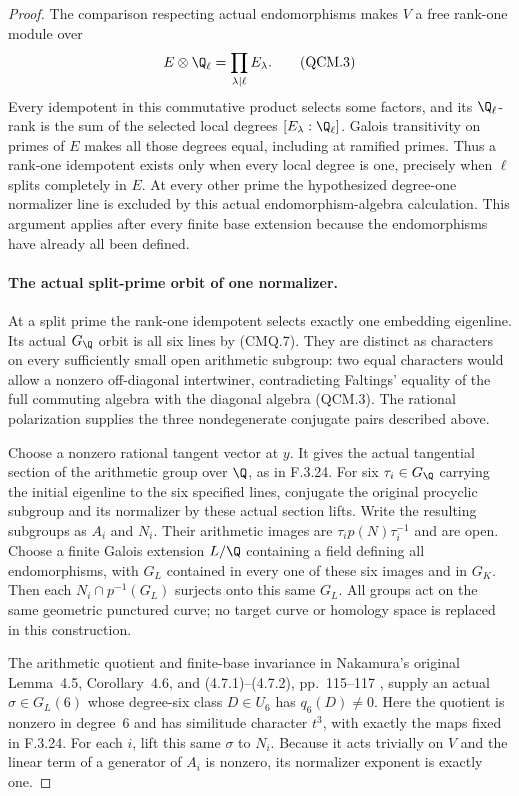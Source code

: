 \begin{proof}
The comparison respecting actual endomorphisms makes
$V$ a free rank-one module over
\[
                E\otimes\Q_\ell=\prod_{\lambda\mid\ell}E_\lambda.
                                                               \tag{QCM.3}
\]
Every idempotent in this commutative product selects
some factors, and its $\Q_\ell$-rank is the sum of
the selected local degrees $[E_\lambda:\Q_\ell]$.
Galois transitivity on primes of $E$ makes all those
degrees equal, including at ramified primes.
Thus a rank-one idempotent exists only when every
local degree is one, precisely when $\ell$ splits
completely in $E$. At every other prime the
hypothesized degree-one normalizer line is excluded
by this actual endomorphism-algebra calculation.
This argument applies after every finite base
extension because the endomorphisms have already
all been defined.

\paragraph{The actual split-prime orbit of one normalizer.}
At a split prime the rank-one idempotent selects
exactly one embedding eigenline. Its actual
$G_{\Q}$ orbit is all six lines by (CMQ.7).
They are distinct as characters on every sufficiently
small open arithmetic subgroup: two equal characters
would allow a nonzero off-diagonal intertwiner,
contradicting Faltings' equality of the full commuting
algebra with the diagonal algebra (QCM.3).
The rational polarization supplies the three
nondegenerate conjugate pairs described above.

Choose a nonzero rational tangent vector at $y$.
It gives the actual tangential section of the
arithmetic group over $\Q$, as in F.3.24. For six
$\tau_i\in G_{\Q}$ carrying the initial eigenline
to the six specified lines, conjugate the original
procyclic subgroup and its normalizer by these
actual section lifts. Write the resulting subgroups
as $A_i$ and $N_i$. Their arithmetic images are
$\tau_i p(N)\tau_i^{-1}$ and are open. Choose a
finite Galois extension $L/\Q$ containing a field
defining all endomorphisms, with $G_L$ contained
in every one of these six images and in $G_K$.
Then each $N_i\cap p^{-1}(G_L)$ surjects onto
this same $G_L$. All groups act on the same
geometric punctured curve; no target curve or
homology space is replaced in this construction.

The arithmetic quotient and finite-base invariance
in Nakamura's original Lemma~4.5, Corollary~4.6,
and (4.7.1)--(4.7.2), pp.~115--117
\cite{AuditNakamura1996}, supply an actual
$\sigma\in G_L(6)$ whose degree-six class
$D\in U_6$ has $q_6(D)\ne0$. Here the quotient
is nonzero in degree~6 and has similitude character
$t^3$, with exactly the maps fixed in F.3.24.
For each $i$, lift this same $\sigma$ to $N_i$.
Because it acts trivially on $V$ and the linear
term of a generator of $A_i$ is nonzero, its
normalizer exponent is exactly one.


\end{proof}
